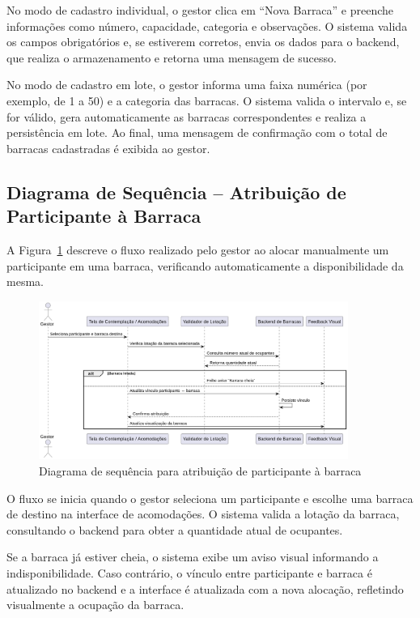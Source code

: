 No modo de cadastro individual, o gestor clica em “Nova Barraca” e preenche informações como número, capacidade, categoria e observações. O sistema valida os campos obrigatórios e, se estiverem corretos, envia os dados para o backend, que realiza o armazenamento e retorna uma mensagem de sucesso.

No modo de cadastro em lote, o gestor informa uma faixa numérica (por exemplo, de 1 a 50) e a categoria das barracas. O sistema valida o intervalo e, se for válido, gera automaticamente as barracas correspondentes e realiza a persistência em lote. Ao final, uma mensagem de confirmação com o total de barracas cadastradas é exibida ao gestor.

\subsection{Diagrama de Sequência – Atribuição de Participante à Barraca}

A Figura~\ref{fig:tentAssign} descreve o fluxo realizado pelo gestor ao alocar manualmente um participante em uma barraca, verificando automaticamente a disponibilidade da mesma.

\begin{figure}[H]
    \centering
    \includegraphics[width=0.9\textwidth]{images/diagramasdesequencias/tentaddParticipant.png}
    \caption{Diagrama de sequência para atribuição de participante à barraca}
    \label{fig:tentAssign}
\end{figure}

O fluxo se inicia quando o gestor seleciona um participante e escolhe uma barraca de destino na interface de acomodações. O sistema valida a lotação da barraca, consultando o backend para obter a quantidade atual de ocupantes.

Se a barraca já estiver cheia, o sistema exibe um aviso visual informando a indisponibilidade. Caso contrário, o vínculo entre participante e barraca é atualizado no backend e a interface é atualizada com a nova alocação, refletindo visualmente a ocupação da barraca.

